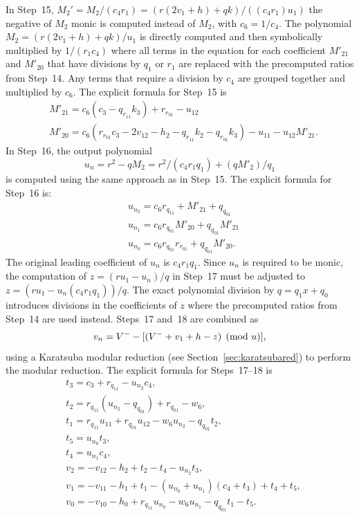 In Step~15, $M_2' = M_2/(c_4r_1) = (r(2v_1 + h) + qk)/((c_4r_1)u_1)$ the
negative of $M_2$ monic is computed instead of $M_2$, with $c_6 = 1/c_4$. The
polynomial $M_2 = (r(2v_1 + h) + qk)/u_1$ is directly computed and then
symbolically multiplied by $1/(r_1c_4)$ where all terms in the equation for each
coefficient $M'_{21}$ and $M'_{20}$ that have divisions by $q_1$ or $r_1$ are
replaced with the precomputed ratios from Step~14. Any terms that require a
division by $c_4$ are grouped together and multiplied by $c_6$. The explicit
formula for Step~15 is  
\begin{align*} 
    & M'_{21} = c_6(c_3 - q_{r_{11}}k_3) + r_{r_{01}} - u_{12}    \\
    & M'_{20} = c_6(r_{r_{01}}c_3 - 2v_{12} - h_2 - q_{r_{11}}k_2 - q_{r_{01}}k_3) - u_{11} - u_{12}M'_{21}.
\end{align*}
In Step~16, the output polynomial $$u_n = r^2 - qM_2 = r^2/(c_4r_1q_1) +
(qM'_2)/q_1$$ is computed using the same approach as in Step~15. The explicit
formula for Step~16 is: 
\begin{align*} 
    & u_{n_2} = c_6r_{q_{11}} + M'_{21} + q_{q_{01}}          \\
    & u_{n_1} = c_6r_{q_{01}}M'_{20} + q_{q_{01}}M'_{21}    \\
    & u_{n_0} = c_6r_{q_{01}}r_{r_{01}} + q_{q_{01}}M'_{20}.
\end{align*}
The original leading coefficient of $u_n$ is $c_4r_1q_1$. Since $u_n$ is required to
be monic, the computation of $z = (ru_1 - u_n)/q$ in Step~17 must be adjusted to
$z = (ru_1 - u_n(c_4r_1q_1))/q$. The exact polynomial division by $q = q_1x +
q_0$ introduces divisions in the coefficients of $z$ where the precomputed
ratios from Step~14 are used instead. Steps~17 and~18 are combined as
$$v_n = V^{-} - [(V^{-} + v_1 + h - z) \pmod{u}],$$ using a Karatsuba modular
reduction (see Section~\ref{sec:karatsubared}) to perform the modular reduction.
The explicit formula for Steps~17--18 is
\begin{align*} 
    & t_3 = c_3 + r_{q_{11}} - u_{n_2}c_4,                   \\
    & t_2 = r_{q_{11}}(u_{n_2} - q_{q_{01}}) + r_{q_{01}} - w_6,   \\
    & t_1 = r_{q_{11}}u_{11} + r_{q_{01}}  u_{12} - w_6u_{n_2} - q_{q_{01}}t_2, \\
    & t_5 = u_{n_0}t_3,       \\
    & t_4 = u_{n_1}c_4,       \\
    & v_2 = -v_{12} - h_2 + t_2 - t_4 - u_{n_2}t_3,       \\
    & v_1 = -v_{11} - h_1 + t_1 - (u_{n_0} + u_{n_1})(c_4 + t_3) + t_4 + t_5,   \\
    & v_0 = -v_{10} - h_0 + r_{q_{11}}  u_{n_0} - w_6u_{n_1} - q_{q_{01}}t_1 - t_5.
\end{align*}

